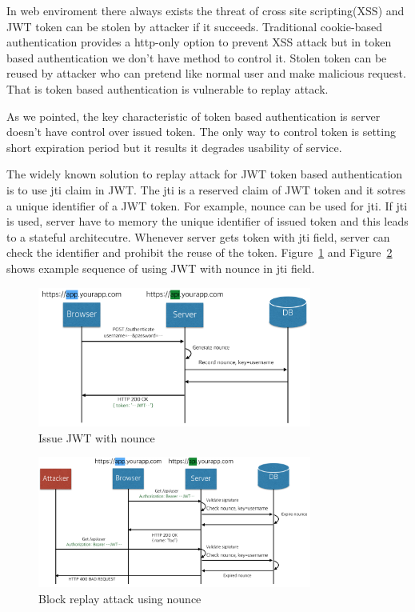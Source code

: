 \documentclass[journal,article,submit,moreauthors,pdftex,10pt,a4paper]{mdpi}
\begin{document}
In web enviroment there always exists the threat of cross site scripting(XSS) and JWT token can be stolen by attacker if it succeeds. Traditional cookie-based authentication provides a http-only option to prevent XSS attack but in token based authentication we don't have method to control it. Stolen token can be reused by attacker who can pretend like normal user and make malicious request. That is token based authentication is vulnerable to replay attack.

As we pointed, the key characteristic of token based authentication is server doesn't have control over issued token. The only way to control token is setting short expiration period but it results it degrades usability of service. 

The widely known solution to replay attack for JWT token based authentication is to use jti claim in JWT. The jti is a reserved claim of JWT token and it sotres a unique identifier of a JWT token. For example, nounce can be used for jti. If jti is used, server have to memory the unique identifier of issued token and this leads to a stateful architecutre. Whenever server gets token with jti field, server can check the identifier and prohibit the reuse of the token. Figure~\ref{nounce_issue} and Figure~\ref{nounce_use} shows example sequence of using JWT with nounce in jti field.

\begin{figure}[H]
\centering
\includegraphics[width=9cm]{figures/nounce_issue}
\caption{Issue JWT with nounce}
\label{nounce_issue}
\end{figure}

\begin{figure}[H]
\centering
\includegraphics[width=9cm]{figures/nounce_use}
\caption{Block replay attack using nounce}
\label{nounce_use}
\end{figure}
\end{document}
